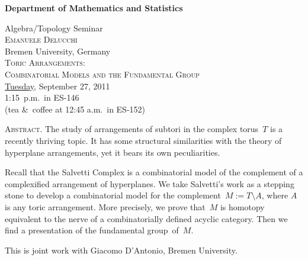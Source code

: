 \documentclass[12pt]{article}
\begin{document}
\noindent\hspace{-28px}%
\hfill\textsf{\textbf{\footnotesize%
Department of Mathematics and Statistics}}\bigskip\bigskip

\begin{center}\Large
  \textsf{{\huge Algebra/Topology Seminar}}\\[2.5\bigskipamount]
  \textsc{Emanuele Delucchi}\\
  {\large Bremen University, Germany}\\[\bigskipamount]
  \textsc{Toric Arrangements:\\ Combinatorial Models and the Fundamental Group}\\[2\bigskipamount]
  \underline{Tuesday}, September 27, 2011\\ 1:15~p.m.\ in ES-146\\
  (tea \&\ coffee at 12:45 a.m.\ in ES-152)
\end{center}\bigskip\bigskip

\large\noindent\textsc{Abstract.}
The study of arrangements of subtori in the complex torus~$T$ is a recently thriving topic.  It has some structural similarities with the theory of hyperplane arrangements, yet it bears its own peculiarities.

Recall that the Salvetti Complex is a combinatorial model of the complement of a complexified arrangement of hyperplanes.  We take Salvetti's work as a stepping stone to develop a combinatorial model for the complement~$M:=T\setminus A$, where $A$ is any toric arrangement.  More precisely, we prove that~$M$ is homotopy equivalent to the nerve of a combinatorially defined acyclic category. Then we find a presentation of the fundamental group~of~$M$.

This is joint work with Giacomo D'Antonio, Bremen University.
\end{document}
